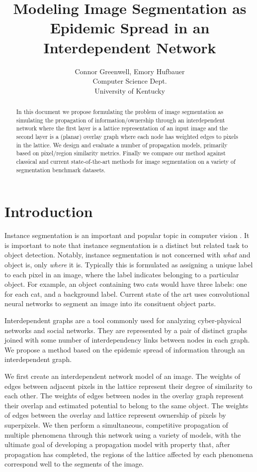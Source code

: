 \documentclass[twocolumn]{article}
\title{Modeling Image Segmentation as Epidemic Spread in an Interdependent Network}
\author{
  Connor Greenwell, Emory Hufbauer\\
  Computer Science Dept. \\
  University of Kentucky
}
\date{}
\begin{document}
\maketitle

\begin{abstract}
In this document we propose formulating the problem of image segmentation as
simulating the propagation of information/ownership through an interdependent
network where the first layer is a lattice representation of an input image and
the second layer is a (planar) overlay graph where each node has weighted edges
to pixels in the lattice. We design and evaluate a number of propagation
models, primarily based on pixel/region similarity metrics. Finally we 
compare our method against classical and current state-of-the-art methods for
image segmentation on a variety of segmentation benchmark datasets. 
\end{abstract}

\section{Introduction}

Instance segmentation is an important and popular topic in computer vision
\cite{newell2017associative, li2017fully, ren2017end}.   It is important to note
that instance segmentation is a distinct but related task to object detection.
Notably, instance segmentation is not concerned with \emph{what} and object
is, only \emph{where} it is. Typically this is formulated as assigning a
unique label to each pixel in an image, where the label indicates belonging to a
particular object. For example, an object containing two cats would have three
labels: one for each cat, and a background label. Current state of the art uses
convolutional neural networks to segment an image into its consituent object
parts.

Interdependent graphs are a tool commonly used for analyzing cyber-physical
networks and social networks. They are represented by a pair of distinct graphs
joined with some number of interdependency links between nodes in each graph.
We propose a method based on the epidemic spread of information through an
interdependent graph.

We first create an interdependent network model of an image. The
weights of edges between adjacent pixels in the lattice represent
their degree of similarity to each other. The weights of edges between
nodes in the overlay graph represent their overlap and estimated
potential to belong to the same object. The weights of edges between the
overlay and lattice represent ownership of pixels by superpixels.
We then perform a simultaneous, competitive propagation of multiple
phenomena through this network using a variety of models, with the
ultimate goal of developing a propagation model with property that,
after propagation has completed, the regions of the lattice affected by
each phenomena correspond well to the segments of the image.
\end{document}
